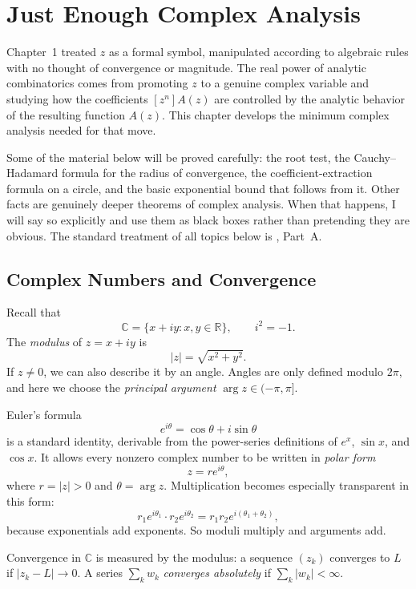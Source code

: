 \chapter{Just Enough Complex Analysis}

Chapter~1 treated $z$ as a formal symbol, manipulated according to algebraic rules with no thought of convergence or magnitude. The real power of analytic combinatorics comes from promoting $z$ to a genuine complex variable and studying how the coefficients $[z^n]A(z)$ are controlled by the analytic behavior of the resulting function $A(z)$. This chapter develops the minimum complex analysis needed for that move.

Some of the material below will be proved carefully: the root test, the Cauchy--Hadamard formula for the radius of convergence, the coefficient-extraction formula on a circle, and the basic exponential bound that follows from it. Other facts are genuinely deeper theorems of complex analysis. When that happens, I will say so explicitly and use them as black boxes rather than pretending they are obvious. The standard treatment of all topics below is \cite{FlajoletSedgewick2009}, Part~A.

\section{Complex Numbers and Convergence}

Recall that
\[
  \mathbb{C} = \{x+iy : x,y \in \mathbb{R}\}, \qquad i^2=-1.
\]
The \emph{modulus} of $z=x+iy$ is
\[
  |z| = \sqrt{x^2+y^2}.
\]
If $z \ne 0$, we can also describe it by an angle. Angles are only defined modulo $2\pi$, and here we choose the \emph{principal argument} $\arg z \in (-\pi,\pi]$.

Euler's formula
\[
  e^{i\theta} = \cos\theta + i\sin\theta
\]
is a standard identity, derivable from the power-series definitions of $e^x$, $\sin x$, and $\cos x$. It allows every nonzero complex number to be written in \emph{polar form}
\[
  z = r e^{i\theta},
\]
where $r=|z|>0$ and $\theta=\arg z$. Multiplication becomes especially transparent in this form:
\[
  r_1 e^{i\theta_1}\cdot r_2 e^{i\theta_2}
  = r_1 r_2 e^{i(\theta_1+\theta_2)},
\]
because exponentials add exponents. So moduli multiply and arguments add.

Convergence in $\mathbb{C}$ is measured by the modulus: a sequence $(z_k)$ converges to $L$ if $|z_k-L| \to 0$. A series $\sum_k w_k$ \emph{converges absolutely} if $\sum_k |w_k| < \infty$.

